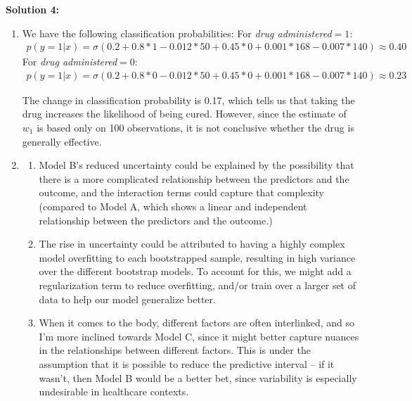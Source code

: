 \documentclass[submit]{harvardml}
\begin{document}
\newpage

\textbf{Solution 4:}

\begin{enumerate}
\item 
We have the following classification probabilities:
For \emph{drug administered}$=1$:
\begin{align*}
    p(y=1|x) = \sigma(0.2 + 0.8 * 1 - 0.012 * 50 + 0.45 * 0 + 0.001 * 168 - 0.007 * 140) \approx 0.40
\end{align*}
For \emph{drug administered}$=0$:
\begin{align*}
    p(y=1|x) = \sigma(0.2 + 0.8 * 0 - 0.012 * 50 + 0.45 * 0 + 0.001 * 168 - 0.007 * 140) \approx 0.23
\end{align*}

The change in classification probability is 0.17, which tells us that taking the drug increases the likelihood of being cured. However, since the estimate of $w_1$ is based only on 100 observations, it is not conclusive whether the drug is generally effective.

\item 
\begin{enumerate}
    \item Model B's reduced uncertainty could be explained by the possibility that there is a more complicated relationship between the predictors and the outcome, and the interaction terms could capture that complexity (compared to Model A, which shows a linear and independent relationship between the predictors and the outcome.)

    \item The rise in uncertainty could be attributed to having a highly complex model overfitting to each bootstrapped sample, resulting in high variance over the different bootstrap models. To account for this, we might add a regularization term to reduce overfitting, and/or train over a larger set of data to help our model generalize better.

    \item When it comes to the body, different factors are often interlinked, and so I'm more inclined towards Model C, since it might better capture nuances in the relationships between different factors. This is under the assumption that it is possible to reduce the predictive interval -- if it wasn't, then Model B would be a better bet, since variability is especially undesirable in healthcare contexts.
\end{enumerate}


\end{enumerate}
\end{document}
